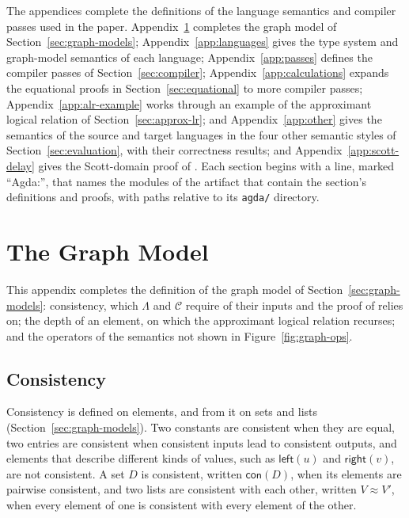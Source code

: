 
\appendix

The appendices complete the definitions of the language semantics and
compiler passes used in the paper. Appendix~\ref{app:graph-model}
completes the graph model of Section~\ref{sec:graph-models};
Appendix~\ref{app:languages} gives the type system and graph-model
semantics of each language; Appendix~\ref{app:passes} defines the
compiler passes of Section~\ref{sec:compiler};
Appendix~\ref{app:calculations} expands the equational proofs in
Section~\ref{sec:equational} to more compiler passes;
Appendix~\ref{app:alr-example} works through an example of the
approximant logical relation of Section~\ref{sec:approx-lr}; and
Appendix~\ref{app:other} gives the semantics of the source and target
languages in the four other semantic styles of
Section~\ref{sec:evaluation}, with their correctness results; and
Appendix~\ref{app:scott-delay} gives the Scott-domain proof of
. Each section begins with a line, marked ``Agda:'', that names the
modules of the artifact that contain the section's definitions and proofs,
with paths relative to its \texttt{agda/} directory.

\section{The Graph Model}
\label{app:graph-model}

This appendix completes the definition of the graph model of
Section~\ref{sec:graph-models}: consistency, which $\Lambda$ and
$\mathcal{C}$ require of their inputs and the proof of 
relies on; the depth of an element, on which the approximant logical
relation recurses; and the operators of the semantics not shown in
Figure~\ref{fig:graph-ops}.

\subsection{Consistency}
\label{app:consistency}

Consistency is defined on elements, and from it on sets and lists
(Section~\ref{sec:graph-models}).  Two constants are consistent when
they are equal, two entries are consistent when consistent inputs lead
to consistent outputs, and elements that describe different kinds of
values, such as $\mathsf{left}(u)$ and $\mathsf{right}(v)$, are not
consistent. A set $D$ is consistent, written $\mathsf{con}(D)$, when
its elements are pairwise consistent, and two lists are consistent
with each other, written $V \approx V'$, when every element of one is
consistent with every element of the other.

